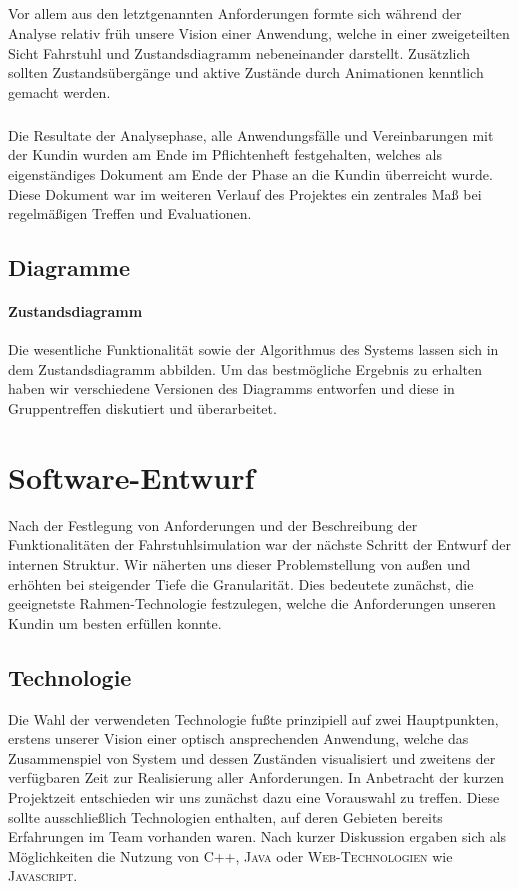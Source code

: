 \paragraph{}Vor allem aus den letztgenannten Anforderungen formte sich während der Analyse relativ früh unsere Vision einer Anwendung, welche in einer zweigeteilten Sicht Fahrstuhl und Zustandsdiagramm nebeneinander darstellt. Zusätzlich sollten Zustandsübergänge und aktive Zustände durch Animationen kenntlich gemacht werden.

\paragraph*{}Die Resultate der Analysephase, alle Anwendungsfälle und Vereinbarungen mit der Kundin wurden am Ende im Pflichtenheft festgehalten, welches als eigenständiges Dokument am Ende der Phase an die Kundin überreicht wurde. Diese Dokument war im weiteren Verlauf des Projektes ein zentrales Maß bei regelmäßigen Treffen und Evaluationen.

\section{Diagramme}
\subsubsection{Zustandsdiagramm}
Die wesentliche Funktionalität sowie der Algorithmus des Systems lassen sich in
dem Zustandsdiagramm abbilden. Um das bestmögliche Ergebnis zu erhalten haben
wir verschiedene Versionen des Diagramms entworfen und diese in Gruppentreffen diskutiert und überarbeitet.


\chapter{Software-Entwurf}
Nach der Festlegung von Anforderungen und der Beschreibung der Funktionalitäten der Fahrstuhlsimulation war der nächste Schritt der Entwurf der internen Struktur. Wir näherten uns dieser Problemstellung von außen und erhöhten bei steigender Tiefe die Granularität. Dies bedeutete zunächst, die geeignetste Rahmen-Technologie festzulegen, welche die Anforderungen unseren Kundin um besten erfüllen konnte.

\section{Technologie}
Die Wahl der verwendeten Technologie fußte prinzipiell auf zwei Hauptpunkten, erstens unserer Vision einer optisch ansprechenden Anwendung, welche das Zusammenspiel von System und dessen Zuständen visualisiert und zweitens der verfügbaren Zeit zur Realisierung aller Anforderungen. In Anbetracht der kurzen Projektzeit entschieden wir uns zunächst dazu eine Vorauswahl zu treffen. Diese sollte ausschließlich Technologien enthalten, auf deren Gebieten bereits Erfahrungen im Team vorhanden waren. Nach kurzer Diskussion ergaben sich als Möglichkeiten die Nutzung von \textsc{C++}, \textsc{Java} oder \textsc{Web-Technologien} wie \textsc{Javascript}.

